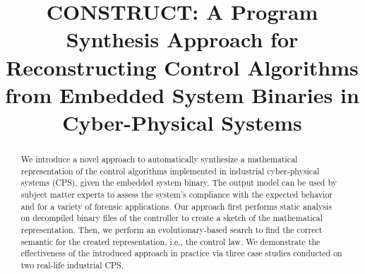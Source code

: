 \documentclass[10pt,conference]{IEEEtran}
\begin{document}
\title{CONSTRUCT: A Program Synthesis Approach for Reconstructing Control Algorithms from Embedded System Binaries in Cyber-Physical Systems}



\author{
}


\maketitle

\begin{abstract}
We introduce a novel approach to automatically synthesize a mathematical representation of the control algorithms implemented in industrial cyber-physical systems (CPS), given the embedded system binary. The output model can be used by subject matter experts to assess the system's compliance with the expected behavior and for a variety of forensic applications. Our approach first performs static analysis on decompiled binary files of the controller to create a sketch of the mathematical representation. Then, we perform an evolutionary-based search to find the correct semantic for the created representation, i.e., the control law. We demonstrate the effectiveness of the introduced approach in practice via three case studies conducted on two real-life industrial CPS. 

\end{abstract}
\end{document}
